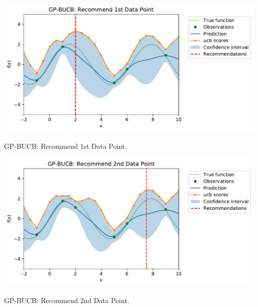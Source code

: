 \vspace{0.5cm}
\begin{minipage}{\textwidth}
  \begin{minipage}[b]{0.49\textwidth}
    \centering
    \includegraphics[scale=0.45]{plots/GP-BUCB:_Recommend_1st_Data_Point.pdf}
     \captionsetup{type=figure}
     \vspace{-0.5cm}
    \caption{GP-BUCB: Recommend 1st Data Point.}
    \label{fig: GP-BUCB:_Recommend_1st_Data_Point.}
\end{minipage}
  \hfill
  \begin{minipage}[b]{0.49\textwidth}
    \centering
    \includegraphics[scale=0.45]{plots/GP-BUCB:_Recommend_2nd_Data_Point.pdf}
     \captionsetup{type=figure}
     \vspace{-0.5cm}
    \caption{GP-BUCB: Recommend 2nd Data Point.
    }
    \label{fig: GP-BUCB:_Recommend_2nd_Data_Point.}
 \end{minipage}
 \end{minipage}
 \vspace{0.5cm}







